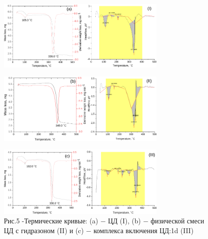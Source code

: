 \begin{figure}[H]
	\centering
	\includegraphics[width=0.74\textwidth]{media/chem2/image58}
\end{figure}
\begin{figure}[H]
	\centering
	\includegraphics[width=0.74\textwidth]{media/chem2/image59}
\end{figure}
\begin{figure}[H]
	\centering
	\includegraphics[width=0.74\textwidth]{media/chem2/image60}
	\caption*{Рис.5 -Термические кривые: (a) − ЦД (I), (b) − физической смеси ЦД с гидразоном (II) и (c) − комплекса включения ЦД:1d (III)}
\end{figure}

